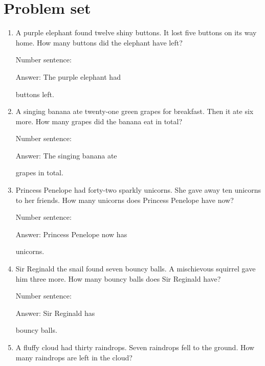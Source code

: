 \documentclass{tufte-book}
\begin{document}
\clearpage\section{Problem set }

\begin{enumerate}

\item
  A purple elephant found twelve shiny buttons. It lost five buttons on
  its way home. How many buttons did the elephant have left?\medskip\par
  Number sentence:
  \dotfill\medskip\par
  Answer: The purple elephant had
  \dotfill\medskip\par\mbox{}\dotfill\medskip\par\mbox{}\dotfill\bigskip
  buttons left.
\item
  A singing banana ate twenty-one green grapes for breakfast. Then it
  ate six more. How many grapes did the banana eat in total?\medskip\par
  Number sentence:
  \dotfill\medskip\par
  Answer: The singing banana ate
  \dotfill\medskip\par\mbox{}\dotfill\medskip\par\mbox{}\dotfill\bigskip
  grapes in total.
\item
  Princess Penelope had forty-two sparkly unicorns. She gave away ten
  unicorns to her friends. How many unicorns does Princess Penelope have
  now?\medskip\par
  Number sentence:
  \dotfill\medskip\par
  Answer: Princess Penelope now has
  \dotfill\medskip\par\mbox{}\dotfill\medskip\par\mbox{}\dotfill\bigskip
  unicorns.
\item
  Sir Reginald the snail found seven bouncy balls. A mischievous
  squirrel gave him three more. How many bouncy balls does Sir Reginald
  have?\medskip\par
  Number sentence:
  \dotfill\medskip\par
  Answer: Sir Reginald has
  \dotfill\medskip\par\mbox{}\dotfill\medskip\par\mbox{}\dotfill\bigskip
  bouncy balls.
\item
  A fluffy cloud had thirty raindrops. Seven raindrops fell to the
  ground. How many raindrops are left in the cloud?\medskip\par

\end{enumerate}
\end{document}
